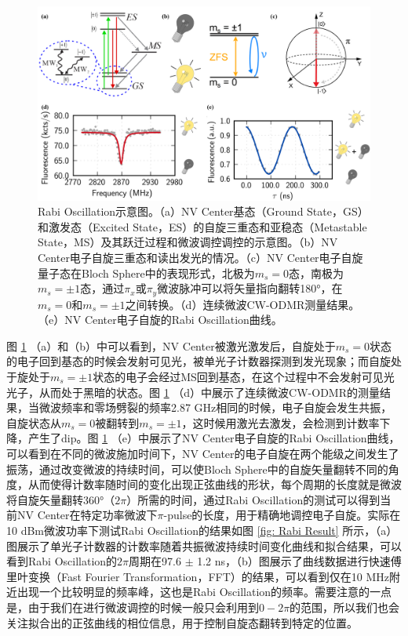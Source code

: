 \documentclass[type = bachelor]{whu-thesis}
\begin{document}
\begin{figure}
  \centering
  \includegraphics[width=1.0\textwidth]{figures/Chapter 1/Rabi Oscillation.png}
  \caption[Rabi Oscillation示意图]{Rabi Oscillation示意图。（a）NV Center基态（Ground State，GS）和激发态（Excited State，ES）的自旋三重态和亚稳态（Metastable State，MS）及其跃迁过程和微波调控调控的示意图。（b）NV Center电子自旋三重态和读出发光的情况。（c）NV Center电子自旋量子态在Bloch Sphere中的表现形式，北极为$m_s=0$态，南极为$m_s=\pm1$态，通过$\pi_x$或$\pi_y$微波脉冲可以将矢量指向翻转180°，在$m_s=0$和$m_s=\pm1$之间转换。（d）连续微波CW-ODMR测量结果。（e）NV Center电子自旋的Rabi Oscillation曲线。}
  \label{fig: Rabi Oscillation}
\end{figure}
图 \ref{fig: Rabi Oscillation} （a）和（b）中可以看到，NV Center被激光激发后，自旋处于$m_s=0$状态的电子回到基态的时候会发射可见光，被单光子计数器探测到发光现象；而自旋处于旋处于$m_s=\pm1$状态的电子会经过MS回到基态，在这个过程中不会发射可见光光子，从而处于黑暗的状态。图 \ref{fig: Rabi Oscillation} （d）中展示了连续微波CW-ODMR的测量结果，当微波频率和零场劈裂的频率2.87 GHz相同的时候，电子自旋会发生共振，自旋状态从$m_s=0$被翻转到$m_s=\pm1$，这时候用激光去激发，会检测到计数率下降，产生了dip。图 \ref{fig: Rabi Oscillation} （e）中展示了NV Center电子自旋的Rabi Oscillation曲线，可以看到在不同的微波施加时间下，NV Center的电子自旋在两个能级之间发生了振荡，通过改变微波的持续时间，可以使Bloch Sphere中的自旋矢量翻转不同的角度，从而使得计数率随时间的变化出现正弦曲线的形状，每个周期的长度就是微波将自旋矢量翻转360°（$2\pi$）所需的时间，通过Rabi Oscillation的测试可以得到当前NV Center在特定功率微波下$\pi$-pulse的长度，用于精确地调控电子自旋。实际在10 dBm微波功率下测试Rabi Oscillation的结果如图 \ref{fig: Rabi Result} 所示，（a）图展示了单光子计数器的计数率随着共振微波持续时间变化曲线和拟合结果，可以看到Rabi Oscillation的$2\pi$周期在97.6 $\pm$ 1.2 ns，（b）图展示了曲线数据进行快速傅里叶变换（Fast Fourier Transformation，FFT）的结果，可以看到仅在10 MHz附近出现一个比较明显的频率峰，这也是Rabi Oscillation的频率。需要注意的一点是，由于我们在进行微波调控的时候一般只会利用到$0-2\pi$的范围，所以我们也会关注拟合出的正弦曲线的相位信息，用于控制自旋态翻转到特定的位置。
\end{document}
